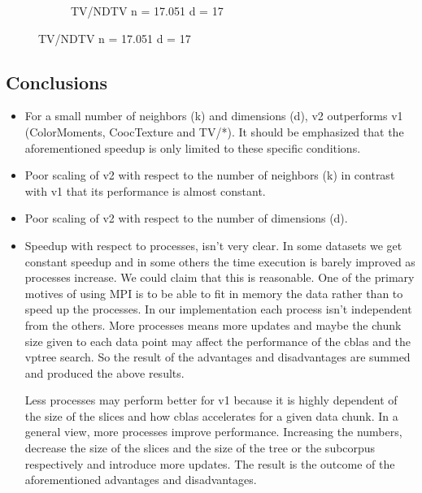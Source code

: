 \documentclass[12pt, a4paper]{article}
\begin{document}
\begin{figure}[h!]
\begin{subfigure}[b]{0.33\textwidth}
         \caption{TV/NDTV n = 17.051 d = 17} 
     \end{subfigure}
\end{figure}

\pagebreak

\subsection{Conclusions}

\begin{itemize}
\itemsep-0.2em 
\item For a small number of neighbors (k) and dimensions (d), v2 outperforms v1 (ColorMoments, CoocTexture and TV/*). It should be emphasized that the aforementioned speedup is only limited to these specific conditions. 
    \item Poor scaling of v2 with respect to the number of neighbors (k) in contrast with v1 that its performance is almost constant.
    \item Poor scaling of v2 with respect to the number of dimensions (d).
    \item Speedup with respect to processes, isn't very clear. In some datasets we get constant speedup and in some others the time execution is barely improved as processes increase. We could claim that this is reasonable. One of the primary motives of using MPI is to be able to fit in memory the data rather than to speed up the processes. In our implementation each process isn't independent from the others. More processes means more updates and maybe the chunk size given to each data point may affect the performance of the cblas and the vptree search. So the result of the advantages and disadvantages are summed and produced the above results.

        Less processes may perform better for v1 because it is highly dependent of the size of the slices and how cblas accelerates for a given data chunk. In a general view, more processes improve performance. Increasing the numbers, decrease the size of the slices and the size of the tree or the subcorpus respectively and introduce more updates. The result is the outcome of the aforementioned advantages and disadvantages.
\end{itemize}
\end{document}
